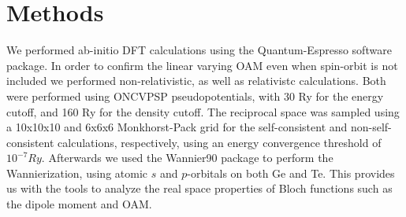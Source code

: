 
\section{Methods}
We performed ab-initio DFT calculations using the Quantum-Espresso software package\cite{Giannozzi2009}. In order to confirm the linear varying OAM even when spin-orbit is not included we performed non-relativistic, as well as relativistc calculations. Both were performed using ONCVPSP pseudopotentials, with 30 Ry for the energy cutoff, and 160 Ry for the density cutoff. The reciprocal space was sampled using a 10x10x10 and 6x6x6 Monkhorst-Pack grid for the self-consistent and non-self-consistent calculations, respectively, using an energy convergence threshold of $10^{-7}Ry$. Afterwards we used the Wannier90 package \cite{Mostofi2014AnFunctions} to perform the Wannierization, using atomic $s$ and $p$-orbitals on both Ge and Te. This provides us with the tools to analyze the real space properties of Bloch functions such as the dipole moment and OAM. 

